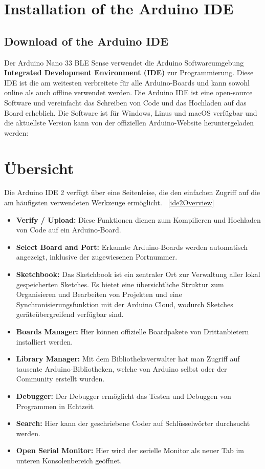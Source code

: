 \section{Installation of the Arduino IDE}

\subsection{Download of the Arduino IDE}

Der Arduino Nano 33 BLE Sense verwendet die  Arduino Softwareumgebung \textbf{Integrated Development Environment (IDE)} zur Programmierung. Diese IDE ist die am weitesten verbreitete für alle Arduino-Boards und kann sowohl online als auch offline verwendet werden. Die Arduino IDE ist eine open-source Software und vereinfacht das Schreiben von Code und das Hochladen auf das Board erheblich. Die Software ist für Windows, Linus und macOS verfügbar und die aktuellste Version kann von der offiziellen Arduino-Website heruntergeladen werden: 

\section{Übersicht}
Die Arduino IDE 2 verfügt über eine Seitenleise, die den einfachen Zugriff auf die am häufigsten verwendeten Werkzeuge ermöglicht. ~\ref{ide2Overview} \cite{arduinodescription:2024}

\begin{itemize}

    \item \textbf{Verify / Upload:} Diese Funktionen dienen zum Kompilieren und Hochladen von Code auf ein Arduino-Board.
    \item \textbf{Select Board and Port:} Erkannte Arduino-Boards werden automatisch angezeigt, inklusive der zugewiesenen Portnummer.
    \item \textbf{Sketchbook:} Das Sketchbook ist ein zentraler Ort zur Verwaltung aller lokal gespeicherten Sketches. Es bietet eine übersichtliche Struktur zum Organisieren und Bearbeiten von Projekten und eine Synchronisierungsfunktion mit der Arduino Cloud, wodurch Sketches geräteübergreifend verfügbar sind.
    \item \textbf{Boards Manager:} Hier können offizielle Boardpakete von Drittanbietern installiert werden.
    \item \textbf{Library Manager:} Mit dem Bibliotheksverwalter hat man Zugriff auf tausente Arduino-Bibliotheken, welche von Arduino selbst oder der Community erstellt wurden.
    \item \textbf{Debugger:} Der Debugger ermöglicht das Testen und Debuggen von Programmen in Echtzeit.
    \item \textbf{Search:} Hier kann der geschriebene Coder auf Schlüsselwörter durchsucht werden.
    \item \textbf{Open Serial Monitor:} Hier wird der serielle Monitor als neuer Tab im unteren Konsolenbereich geöffnet.
\end{itemize}


